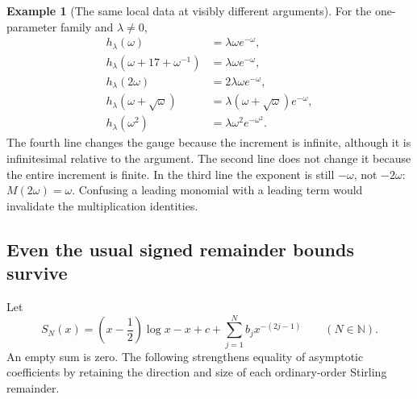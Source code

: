 \documentclass[11pt,letterpaper]{article}
\numberwithin{equation}{section}
\theoremstyle{plain}
\theoremstyle{definition}
\newtheorem{example}[example]{Example}
\theoremstyle{remark}
\newcommand{\N}{\mathbb N}
\begin{document}
\begin{example}[The same local data at visibly different arguments]
For the one-parameter family and $\lambda\ne0$,
\begin{align*}
 h_\lambda(\omega)&=\lambda\omega e^{-\omega},\\
 h_\lambda(\omega+17+\omega^{-1})&=\lambda\omega e^{-\omega},\\
 h_\lambda(2\omega)&=2\lambda\omega e^{-\omega},\\
 h_\lambda(\omega+\sqrt\omega)&=
 \lambda(\omega+\sqrt\omega)e^{-\omega},\\
 h_\lambda(\omega^2)&=\lambda\omega^2e^{-\omega^2}.
\end{align*}
The fourth line changes the gauge because the increment is infinite,
although it is infinitesimal relative to the argument. The second line does
not change it because the entire increment is finite. In the third line the
exponent is still $-\omega$, not $-2\omega$: $M(2\omega)=\omega$.
Confusing a leading monomial with a leading term would invalidate the
multiplication identities.
\end{example}

\subsection{Even the usual signed remainder bounds survive}
Let
\begin{equation}\label{eq:stirling-truncation}
 S_N(x)=\left(x-\frac12\right)\log x-x+c+
 \sum_{j=1}^{N}b_jx^{-(2j-1)}\qquad(N\in\N).
\end{equation}
An empty sum is zero. The following strengthens equality of asymptotic
coefficients by retaining the direction and size of each ordinary-order
Stirling remainder.
\end{document}
